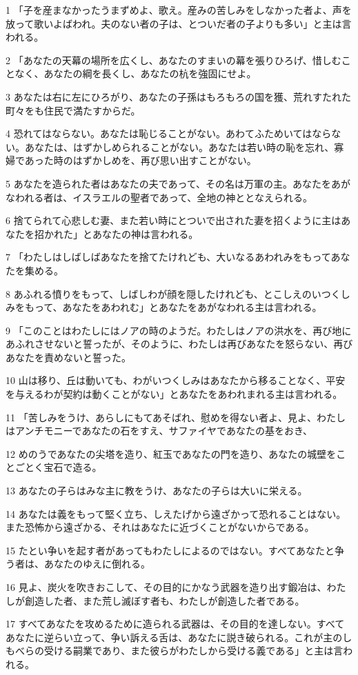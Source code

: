\par 1 「子を産まなかったうまずめよ、歌え。産みの苦しみをしなかった者よ、声を放って歌いよばわれ。夫のない者の子は、とついだ者の子よりも多い」と主は言われる。
\par 2 「あなたの天幕の場所を広くし、あなたのすまいの幕を張りひろげ、惜しむことなく、あなたの綱を長くし、あなたの杭を強固にせよ。
\par 3 あなたは右に左にひろがり、あなたの子孫はもろもろの国を獲、荒れすたれた町々をも住民で満たすからだ。
\par 4 恐れてはならない。あなたは恥じることがない。あわてふためいてはならない。あなたは、はずかしめられることがない。あなたは若い時の恥を忘れ、寡婦であった時のはずかしめを、再び思い出すことがない。
\par 5 あなたを造られた者はあなたの夫であって、その名は万軍の主。あなたをあがなわれる者は、イスラエルの聖者であって、全地の神ととなえられる。
\par 6 捨てられて心悲しむ妻、また若い時にとついで出された妻を招くように主はあなたを招かれた」とあなたの神は言われる。
\par 7 「わたしはしばしばあなたを捨てたけれども、大いなるあわれみをもってあなたを集める。
\par 8 あふれる憤りをもって、しばしわが顔を隠したけれども、とこしえのいつくしみをもって、あなたをあわれむ」とあなたをあがなわれる主は言われる。
\par 9 「このことはわたしにはノアの時のようだ。わたしはノアの洪水を、再び地にあふれさせないと誓ったが、そのように、わたしは再びあなたを怒らない、再びあなたを責めないと誓った。
\par 10 山は移り、丘は動いても、わがいつくしみはあなたから移ることなく、平安を与えるわが契約は動くことがない」とあなたをあわれまれる主は言われる。
\par 11 「苦しみをうけ、あらしにもてあそばれ、慰めを得ない者よ、見よ、わたしはアンチモニーであなたの石をすえ、サファイヤであなたの基をおき、
\par 12 めのうであなたの尖塔を造り、紅玉であなたの門を造り、あなたの城壁をことごとく宝石で造る。
\par 13 あなたの子らはみな主に教をうけ、あなたの子らは大いに栄える。
\par 14 あなたは義をもって堅く立ち、しえたげから遠ざかって恐れることはない。また恐怖から遠ざかる、それはあなたに近づくことがないからである。
\par 15 たとい争いを起す者があってもわたしによるのではない。すべてあなたと争う者は、あなたのゆえに倒れる。
\par 16 見よ、炭火を吹きおこして、その目的にかなう武器を造り出す鍛冶は、わたしが創造した者、また荒し滅ぼす者も、わたしが創造した者である。
\par 17 すべてあなたを攻めるために造られる武器は、その目的を達しない。すべてあなたに逆らい立って、争い訴える舌は、あなたに説き破られる。これが主のしもべらの受ける嗣業であり、また彼らがわたしから受ける義である」と主は言われる。

